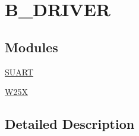 \hypertarget{group___b___d_r_i_v_e_r}{}\section{B\+\_\+\+D\+R\+I\+V\+ER}
\label{group___b___d_r_i_v_e_r}
\subsection*{Modules}
\begin{DoxyCompactItemize}
\item 
\mbox{\hyperlink{group___s_u_a_r_t}{S\+U\+A\+RT}}
\item 
\mbox{\hyperlink{group___w25_x}{W25X}}
\end{DoxyCompactItemize}


\subsection{Detailed Description}
